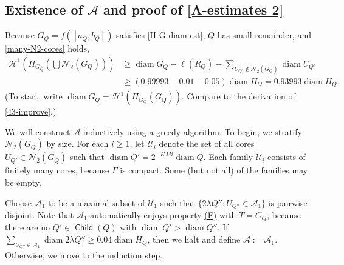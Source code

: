 \documentclass[12pt]{amsart}
\numberwithin{equation}{section}
\theoremstyle{plain}
\theoremstyle{definition}
\newcommand{\diam}{\mathop\mathrm{diam}\nolimits}
\newcommand{\Haus}{\mathcal{H}}
\newcommand{\Child}{\mathop\mathsf{Child}\nolimits}
\numberwithin{figure}{section}
\begin{document}
\subsection{Existence of $\mathcal{A}$ and proof of \eqref{A-estimates 2}} \label{ss:A}

Because $G_Q=f([a_Q,b_Q])$ satisfies \eqref{H-G diam est}, $Q$ has small remainder, and \eqref{many-N2-cores} holds,
\begin{equation}\begin{split} \label{A construction N_2 estimate}
      \Haus^1\left(\Pi_{G_Q}\left(\textstyle\bigcup\mathcal{N}_2(G_Q)\right)\right)  &\geq \diam G_Q - \ell(R_Q) - \sum_{U_{Q'} \not \in \mathcal{N}_2(G_Q)}\diam U_{Q'}\\
    & \ge (0.99993-0.01-0.05)\diam H_Q = 0.93993 \diam H_Q.
\end{split}\end{equation} (To start, write $\diam G_Q=\Haus^1(\Pi_{G_Q}(G_Q))$. Compare to the derivation of \eqref{43-improve}.)

We will construct $\mathcal{A}$ inductively using a greedy algorithm. To begin, we stratify $\mathcal{N}_2(G_Q)$ by size. For each $i\geq 1$, let $\mathcal{U}_i$ denote the set of all cores $U_{Q'}\in\mathcal{N}_2(G_Q)$ such that $\diam Q' = 2^{-KMi}\diam Q$. Each family $\mathcal{U}_i$ consists of finitely many cores, because $\Gamma$ is compact. Some (but not all) of the families may be empty.

Choose $\mathcal{A}_1$ to be a maximal subset of $\mathcal{U}_{1}$ such that $\{2\lambda Q'':U_{Q''}\in\mathcal{A}_1\}$ is pairwise disjoint. Note that $\mathcal{A}_1$ automatically enjoys property \hyperref[property-F]{(F)} with $T=G_Q$, because there are no $Q'\in\Child(Q)$ with $\diam Q'>\diam Q''$. If $\sum_{U_{Q''} \in \mathcal{A}_1} \diam 2\lambda Q'' \ge 0.04 \diam H_Q$, then we halt and define $\mathcal{A}:= \mathcal{A}_1$. Otherwise, we move to the induction step.
\end{document}

